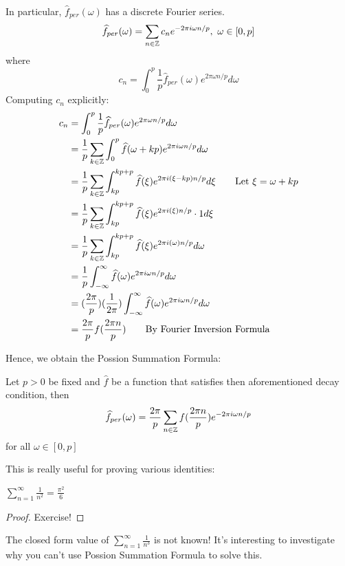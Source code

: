 \documentclass{article}
\begin{document}
In particular, $\widehat{f}_{per}(\omega)$ has a discrete Fourier series.
\[\widehat{f}_{per}(\omega) = \sum_{n \in \mathbb{Z}} c_n e^{-2\pi i \omega n/p},\ \omega \in [0, p]\]
where
\[c_n = \int_0^p \frac{1}{p} \widehat{f}_{per}(\omega) e^{2\pi \omega n/p} d\omega\]
Computing $c_n$ explicitly:
\begin{align*}
    c_n &= \int_0^p \frac{1}{p} \widehat{f}_{per}(\omega) e^{2\pi \omega n/p} d\omega\\
    &= \frac{1}{p} \sum_{k \in \mathbb{Z}} \int_0^p \widehat{f}(\omega + kp) e^{2\pi i \omega n/p} d\omega\\
    &= \frac{1}{p} \sum_{k \in \mathbb{Z}} \int_{kp}^{kp+p} \widehat{f}(\xi) e^{2\pi i(\xi - kp)n/p} d\xi \tag*{Let $\xi = \omega + kp$}\\
    &= \frac{1}{p} \sum_{k \in \mathbb{Z}} \int_{kp}^{kp+p} \widehat{f}(\xi) e^{2\pi i(\xi)n/p}\cdot 1 d\xi\\
    &= \frac{1}{p} \sum_{k \in \mathbb{Z}} \int_{kp}^{kp+p} \widehat{f}(\xi) e^{2\pi i(\omega)n/p} d\omega\\
    &= \frac{1}{p} \int_{-\infty}^\infty \widehat{f}(\omega) e^{2\pi i \omega n/p} d\omega\\
    &= (\frac{2\pi}{p}) (\frac{1}{2\pi}) \int_{-\infty}^\infty \widehat{f}(\omega) e^{2\pi i \omega n/p} d\omega\\
    &= \frac{2\pi}{p} f(\frac{2\pi n}{p}) \tag*{By Fourier Inversion Formula}
\end{align*}

Hence, we obtain the Possion Summation Formula:
\begin{theorem}
Let $p > 0$ be fixed and $\widehat{f}$ be a function that satisfies then aforementioned decay condition, then
   $$\widehat{f}_{per}(\omega) = \frac{2\pi}{p} \sum_{n \in \mathbb{Z}} f(\frac{2\pi n}{p}) e^{-2\pi i \omega n/p}$$
for all $\omega \in [0, p]$
\end{theorem}

This is really useful for proving various identities:
\begin{corollary}
    $\sum_{n = 1}^\infty \frac{1}{n^2} = \frac{\pi^2}{6}$
\end{corollary}

\begin{proof}
    Exercise!
\end{proof}

\begin{remark}
    The closed form value of $\sum_{n = 1}^\infty \frac{1}{n^3}$ is not known! It's interesting to investigate why you can't use Possion Summation Formula to solve this.
\end{remark}
\end{document}
